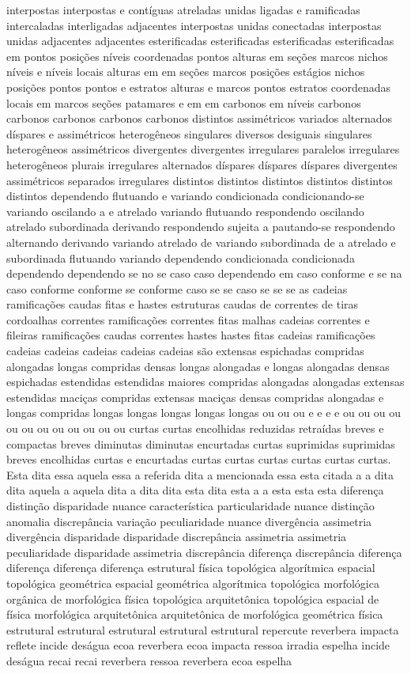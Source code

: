 interpostas interpostas e contíguas atreladas unidas ligadas e ramificadas intercaladas interligadas adjacentes interpostas unidas conectadas interpostas unidas adjacentes adjacentes esterificadas esterificadas esterificadas esterificadas em pontos posições níveis coordenadas pontos alturas em seções marcos nichos níveis e níveis locais alturas em em seções marcos posições estágios nichos posições pontos pontos e estratos alturas e marcos pontos estratos coordenadas locais em marcos seções patamares e em em carbonos em níveis carbonos carbonos carbonos carbonos carbonos distintos assimétricos variados alternados díspares e assimétricos heterogêneos singulares diversos desiguais singulares heterogêneos assimétricos divergentes divergentes irregulares paralelos irregulares heterogêneos plurais irregulares alternados díspares díspares díspares divergentes assimétricos separados irregulares distintos distintos distintos distintos distintos distintos dependendo flutuando e variando condicionada condicionando-se variando oscilando a e atrelado variando flutuando respondendo oscilando atrelado subordinada derivando respondendo sujeita a pautando-se respondendo alternando derivando variando atrelado de variando subordinada de a atrelado e subordinada flutuando variando dependendo condicionada condicionada dependendo dependendo se no se caso caso dependendo em caso conforme e se na caso conforme conforme se conforme caso se se caso se se se as cadeias ramificações caudas fitas e hastes estruturas caudas de correntes de tiras cordoalhas correntes ramificações correntes fitas malhas cadeias correntes e fileiras ramificações caudas correntes hastes hastes fitas cadeias ramificações cadeias cadeias cadeias cadeias cadeias são extensas espichadas compridas alongadas longas compridas densas longas alongadas e longas alongadas densas espichadas estendidas estendidas maiores compridas alongadas alongadas extensas estendidas maciças compridas extensas maciças densas compridas alongadas e longas compridas longas longas longas longas longas ou ou ou e e e e ou ou ou ou ou ou ou ou ou ou ou ou curtas curtas encolhidas reduzidas retraídas breves e compactas breves diminutas diminutas encurtadas curtas suprimidas suprimidas breves encolhidas curtas e encurtadas curtas curtas curtas curtas curtas curtas. Esta dita essa aquela essa a referida dita a mencionada essa esta citada a a dita dita aquela a aquela dita a dita dita esta dita esta a a esta esta esta diferença distinção disparidade nuance característica particularidade nuance distinção anomalia discrepância variação peculiaridade nuance divergência assimetria divergência disparidade disparidade discrepância assimetria assimetria peculiaridade disparidade assimetria discrepância diferença discrepância diferença diferença diferença diferença estrutural física topológica algorítmica espacial topológica geométrica espacial geométrica algorítmica topológica morfológica orgânica de morfológica física topológica arquitetônica topológica espacial de física morfológica arquitetônica arquitetônica de morfológica geométrica física estrutural estrutural estrutural estrutural estrutural repercute reverbera impacta reflete incide deságua ecoa reverbera ecoa impacta ressoa irradia espelha incide deságua recai recai reverbera ressoa reverbera ecoa espelha 